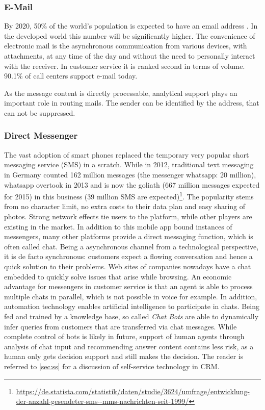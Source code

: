 		\subsubsection{E-Mail}
		
		By 2020, 50\% of the world's population is expected to have an email address \citep{radial2016}. In the developed world this number will be significantly higher. The convenience of electronic mail is the asynchronous communication from various devices, with attachments, at any time of the day and without the need to personally interact with the receiver. In customer service it is ranked second in terms of volume. 90.1\% of call centers support e-mail \citep{dimensiondata2016} today. %
		
		As the message content is directly processable, analytical support plays an important role in routing mails. The sender can be identified by the address, that can not be suppressed. 
		\todo{+++}
		\subsubsection{Direct Messenger}
		The vast adoption of smart phones replaced the temporary very popular short messaging service (SMS) in a scratch.  While in 2012, traditional text messaging in Germany counted 162 million messages (the messenger whatsapp: 20 million), whatsapp overtook in 2013 and is now the goliath (667 million messages expected for 2015) in this business (39 million SMS are expected)\footnote{\cf \url{https://de.statista.com/statistik/daten/studie/3624/umfrage/entwicklung- der-anzahl-gesendeter-sms--mms-nachrichten-seit-1999/}}. The popularity stems from no character limit, no extra costs to their data plan and easy sharing of photos. Strong network effects tie users to the platform, while other players are existing in the market. In addition to this mobile app bound instances of messengers, many other platforms provide a direct messaging function, which is often called chat. Being a asynchronous channel from a technological perspective, it is de facto synchronous: customers expect a flowing conversation and hence a quick solution to their problems. Web sites of companies nowadays have a chat embedded to quickly solve issues that arise while browsing. An economic advantage for messengers in customer service is that an agent is able to process multiple chats in parallel, which is not possible in voice for example. In addition, automation technology enables artificial intelligence to participate in chats. Being fed and trained by a knowledge base, so called \textit{Chat Bots} are able to dynamically infer queries from customers that are transferred via chat messages. While complete control of bots is likely in future, support of human agents through analysis of chat input and recommending answer content contains less risk, as a human only gets decision support and still makes the decision. The reader is referred to \ref{sec:ss} for a discussion of self-service technology in \acrshort{CRM}. 
		

